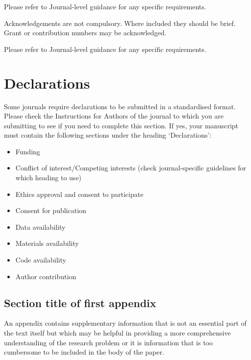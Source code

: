 \documentclass[pdflatex,sn-mathphys-num]{sn-jnl}%
\theoremstyle{thmstyleone}%
\theoremstyle{thmstyletwo}%
\theoremstyle{thmstylethree}%
\begin{document}
{Please refer to Journal-level guidance for any specific requirements.


Acknowledgements are not compulsory. Where included they should be brief. Grant or contribution numbers may be acknowledged.

Please refer to Journal-level guidance for any specific requirements.

\section*{Declarations}

Some journals require declarations to be submitted in a standardised format. Please check the Instructions for Authors of the journal to which you are submitting to see if you need to complete this section. If yes, your manuscript must contain the following sections under the heading `Declarations':

\begin{itemize}
\item Funding
\item Conflict of interest/Competing interests (check journal-specific guidelines for which heading to use)
\item Ethics approval and consent to participate
\item Consent for publication
\item Data availability 
\item Materials availability
\item Code availability 
\item Author contribution
\end{itemize}


\begin{appendices}

\section{Section title of first appendix}\label{secA1}

An appendix contains supplementary information that is not an essential part of the text itself but which may be helpful in providing a more comprehensive understanding of the research problem or it is information that is too cumbersome to be included in the body of the paper.



\end{appendices}}
\end{document}
